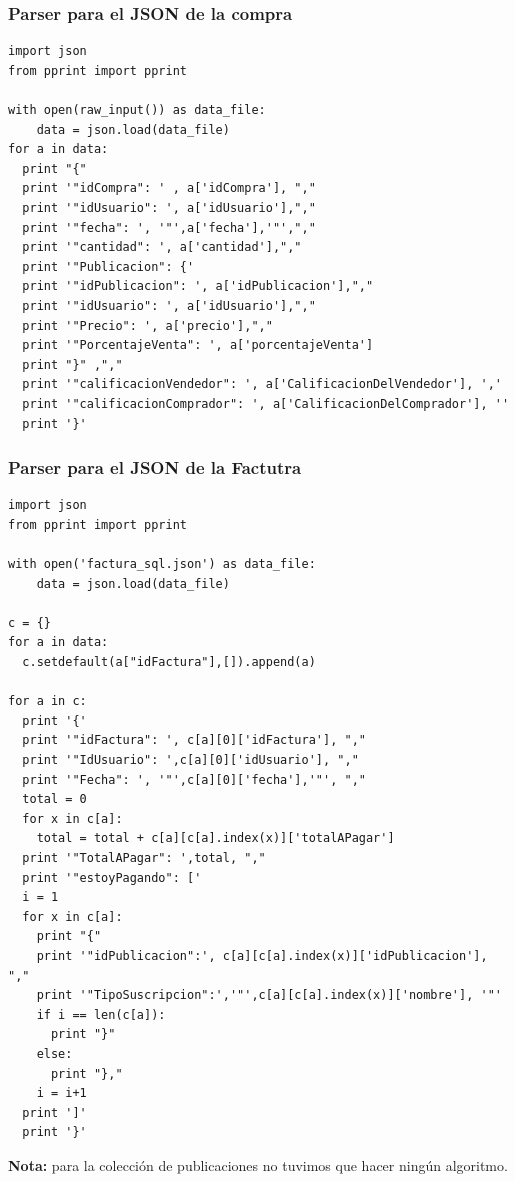 \documentclass[a4paper, 10pt, twoside]{article}
\begin{document}
\subsubsection{Parser para el JSON de la compra}

\begin{verbatim}
import json
from pprint import pprint

with open(raw_input()) as data_file:    
    data = json.load(data_file)
for a in data:
  print "{"
  print '"idCompra": ' , a['idCompra'], ","
  print '"idUsuario": ', a['idUsuario'],","
  print '"fecha": ', '"',a['fecha'],'"',","
  print '"cantidad": ', a['cantidad'],","
  print '"Publicacion": {'
  print '"idPublicacion": ', a['idPublicacion'],","
  print '"idUsuario": ', a['idUsuario'],","
  print '"Precio": ', a['precio'],","
  print '"PorcentajeVenta": ', a['porcentajeVenta']
  print "}" ,","
  print '"calificacionVendedor": ', a['CalificacionDelVendedor'], ','
  print '"calificacionComprador": ', a['CalificacionDelComprador'], ''
  print '}'

\end{verbatim}

\newpage
\subsubsection{Parser para el JSON de la Factutra}

\begin{verbatim}
import json
from pprint import pprint

with open('factura_sql.json') as data_file:    
    data = json.load(data_file)

c = {}
for a in data:
  c.setdefault(a["idFactura"],[]).append(a)

for a in c:
  print '{'
  print '"idFactura": ', c[a][0]['idFactura'], ","
  print '"IdUsuario": ',c[a][0]['idUsuario'], ","
  print '"Fecha": ', '"',c[a][0]['fecha'],'"', ","
  total = 0
  for x in c[a]:
    total = total + c[a][c[a].index(x)]['totalAPagar']
  print '"TotalAPagar": ',total, ","
  print '"estoyPagando": ['
  i = 1
  for x in c[a]:
    print "{"
    print '"idPublicacion":', c[a][c[a].index(x)]['idPublicacion'], ","
    print '"TipoSuscripcion":','"',c[a][c[a].index(x)]['nombre'], '"'
    if i == len(c[a]):
      print "}"
    else:
      print "},"
    i = i+1
  print ']'
  print '}'

\end{verbatim}

\textbf{Nota:} para la colecci\'on de publicaciones no tuvimos que hacer ning\'un algoritmo.
\end{document}
